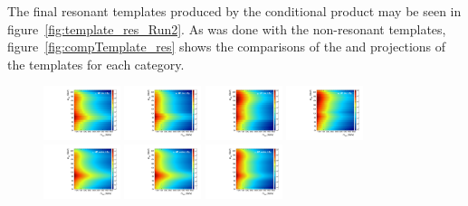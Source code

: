 The final resonant templates produced by the conditional product may be seen in figure~\ref{fig:template_res_Run2}.
As was done with the non-resonant templates, figure~\ref{fig:compTemplate_res} shows the comparisons of the \MVV and \MJ projections of the templates for each category.

\begin{figure}[htbp]
  \centering
  \includegraphics[width=0.2\textwidth]{fig/2Dfit/template_res_mu_HP_bb_LDy.pdf}
  \includegraphics[width=0.2\textwidth]{fig/2Dfit/template_res_e_HP_bb_LDy.pdf}
  \includegraphics[width=0.2\textwidth]{fig/2Dfit/template_res_mu_LP_bb_LDy.pdf}
  \includegraphics[width=0.2\textwidth]{fig/2Dfit/template_res_e_LP_bb_LDy.pdf}\\
  \includegraphics[width=0.2\textwidth]{fig/2Dfit/template_res_mu_HP_nobb_LDy.pdf}
  \includegraphics[width=0.2\textwidth]{fig/2Dfit/template_res_e_HP_nobb_LDy.pdf}
  \includegraphics[width=0.2\textwidth]{fig/2Dfit/template_res_mu_LP_nobb_LDy.pdf}

\end{figure}
